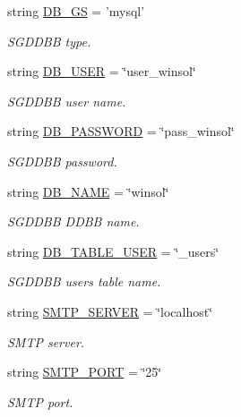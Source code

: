 \begin{CompactItemize}
string \hyperlink{namespaceweb__winsol_28cba69d5286b28f6fce9d69445fe806}{DB\_\-GS} = 'mysql'
\begin{CompactList}\small\item\em SGDDBB type. \item\end{CompactList}\item 
string \hyperlink{namespaceweb__winsol_2682f1bde5835a4b30d041417934f22d}{DB\_\-USER} = \char`\"{}user\_\-winsol\char`\"{}
\begin{CompactList}\small\item\em SGDDBB user name. \item\end{CompactList}\item 
string \hyperlink{namespaceweb__winsol_4df7e3e505b5053643297de45f37279c}{DB\_\-PASSWORD} = \char`\"{}pass\_\-winsol\char`\"{}
\begin{CompactList}\small\item\em SGDDBB password. \item\end{CompactList}\item 
string \hyperlink{namespaceweb__winsol_5b04722a983ed37fc2169504bb5b1274}{DB\_\-NAME} = \char`\"{}winsol\char`\"{}
\begin{CompactList}\small\item\em SGDDBB DDBB name. \item\end{CompactList}\item 
string \hyperlink{namespaceweb__winsol_d199e10256098a9ead9451cb224d92ad}{DB\_\-TABLE\_\-USER} = \char`\"{}\_\-users\char`\"{}
\begin{CompactList}\small\item\em SGDDBB users table name. \item\end{CompactList}\item 
string \hyperlink{namespaceweb__winsol_56b91d3eaf088a06f26e7f5bbc74f8b9}{SMTP\_\-SERVER} = \char`\"{}localhost\char`\"{}
\begin{CompactList}\small\item\em SMTP server. \item\end{CompactList}\item 
string \hyperlink{namespaceweb__winsol_66d26cb466b69ea1a7049aee2309f318}{SMTP\_\-PORT} = \char`\"{}25\char`\"{}
\begin{CompactList}\small\item\em SMTP port. \item\end{CompactList}\item 

\end{CompactItemize}

